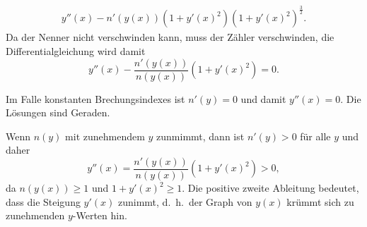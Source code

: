 \begin{loesung}
\begin{teilaufgaben}
\begin{align*}
{y''(x)
-
n'(y(x))
(1+y'(x)^2)
}{
(1+y'(x)^2)^{\frac32}
}.
\end{align*}
Da der Nenner nicht verschwinden kann, muss der Zähler verschwinden,
die Differentialgleichung wird damit
\[
y''(x)
-
\frac{n'(y(x))}{n(y(x))} (1 + y'(x)^2)
=
0.
\]
\item
Im Falle konstanten Brechungsindexes ist $n'(y)=0$ und damit $y''(x)=0$.
Die Lösungen sind Geraden.
\item
Wenn $n(y)$ mit zunehmendem $y$ zunmimmt, dann ist $n'(y)>0$ für alle $y$
und daher
\[
y''(x)
=
\frac{n'(y(x))}{n(y(x))} (1 + y'(x)^2)
>
0,
\]
da $n(y(x))\ge 1$ und $1+y'(x)^2\ge 1$.
Die positive zweite Ableitung bedeutet, dass die Steigung $y'(x)$ zunimmt,
d.~h.~der Graph von $y(x)$ krümmt sich zu zunehmenden $y$-Werten hin.
\qedhere
\end{teilaufgaben}
\end{loesung}


